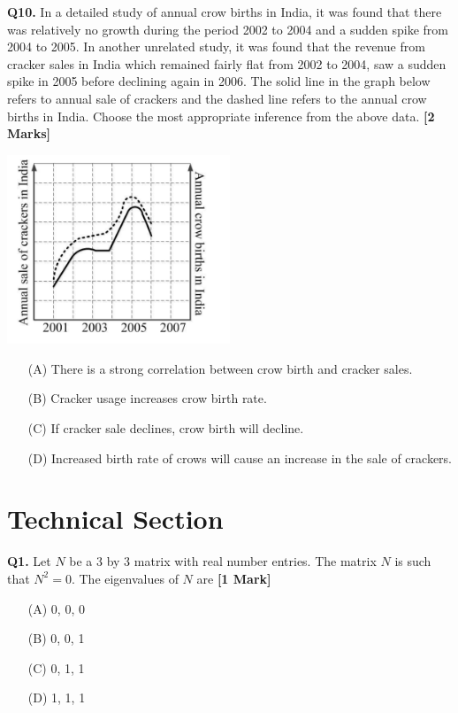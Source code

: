 \documentclass[11pt]{article}
\newcommand{\questiona}[2]{
    \noindent\textbf{Q#2.} #1 \hfill \textbf{[1 Mark]}
}
\newcommand{\questionb}[2]{
    \noindent\textbf{Q#2.} #1 \hfill \textbf{[2 Marks]}
}
\begin{document}
\questionb{In a detailed study of annual crow births in India, it was found that there was relatively no growth during the period 2002 to 2004 and a sudden spike from 2004 to 2005. In another unrelated study, it was found that the revenue from cracker sales in India which remained fairly flat from 2002 to 2004, saw a sudden spike in 2005 before declining again in 2006. The solid line in the graph below refers to annual sale of crackers and the dashed line refers to the annual crow births in India. Choose the most appropriate inference from the above data.}{10}
\begin{center}
\includegraphics[width=0.5\textwidth]{figures/10.png}
\end{center}
\begin{enumerate}
    \item[(A)] There is a strong correlation between crow birth and cracker sales.
    \item[(B)] Cracker usage increases crow birth rate.
    \item[(C)] If cracker sale declines, crow birth will decline.
    \item[(D)] Increased birth rate of crows will cause an increase in the sale of crackers.
\end{enumerate}
\vspace{0.5cm}

\section*{Technical Section}

\questiona{Let \(N\) be a 3 by 3 matrix with real number entries. The matrix \(N\) is such that \(N^2 = 0\). The eigenvalues of \(N\) are}{1}
\begin{enumerate}
    \item[(A)] 0, 0, 0
    \item[(B)] 0, 0, 1
    \item[(C)] 0, 1, 1
    \item[(D)] 1, 1, 1
\end{enumerate}
\vspace{0.5cm}
\end{document}
